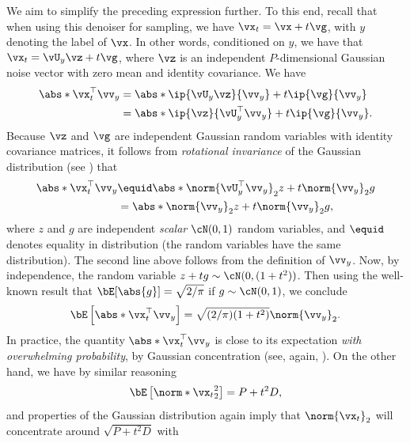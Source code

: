 \documentclass[../../book-main.tex]{subfiles}
\begin{document}
\begin{example}
    We aim to simplify the preceding expression further.
    To this end, recall that when using this denoiser for sampling, we have
    $\vx_t = \vx + t \vg$, with $y$ denoting the label of $\vx$.
    In other words, conditioned on $y$, we have that $\vx_t = \vU_y \vz
    + t \vg$, where $\vz$ is an independent $P$-dimensional Gaussian
    noise vector with zero mean and identity covariance.
    We have
    \begin{align*}
        \abs*{\vx_t^\top \vv_y}
        &=
        \abs*{\ip{\vU_y \vz}{\vv_y} + t \ip{\vg}{\vv_y}}
        \\
        &=
        \abs*{\ip{\vz}{\vU_y^\top \vv_y} + t \ip{\vg}{\vv_y}}.
    \end{align*}
    Because $\vz$ and $\vg$ are independent Gaussian random variables with
    identity covariance matrices, it follows from \textit{rotational invariance}
    of the Gaussian distribution (see \cite{Vershynin2018-br}) that
    \begin{align*}
        \abs*{\vx_t^\top \vv_y}
        &\equid
        \abs*{\norm{\vU_y^\top \vv_y}_2 z + t\norm{\vv_y}_2 g}
        \\
        &=
        \abs*{\norm{\vv_y}_2 z + t\norm{\vv_y}_2 g},
    \end{align*}
    where $z$ and $g$ are independent \textit{scalar} $\cN(0, 1)$ random
    variables, and $\equid$ denotes equality in distribution (the random
    variables have the same distribution).
    The second line above follows from the definition of $\vv_y$.
    Now, by independence, the random variable $z + tg \sim \cN(0, (1 + t^2))$.
    Then using the well-known result that $\bE[\abs{g}] = \sqrt{2/\pi}$ if $g
    \sim \cN(0, 1)$, we conclude
    \begin{equation*}
        \bE\left[
            \abs*{\vx_t^\top \vv_y}
        \right]
        =
        \sqrt{(2/\pi) (1 + t^2)} \norm{\vv_y}_2.
    \end{equation*}
    In practice, the quantity $ \abs*{\vx_t^\top \vv_y}$ is close to its
    expectation \textit{with overwhelming probability}, by Gaussian
    concentration (see, again, \cite{Vershynin2018-br}).
    On the other hand, we have by similar reasoning
    \begin{equation*}
        \bE\left[
            \norm*{\vx_t}_2^2
        \right]
        =
        P + t^2 D,
    \end{equation*}
    and properties of the Gaussian distribution again imply that
    $\norm{\vx_t}_2$ will concentrate around $\sqrt{P + t^2 D}$ with

\end{example}
\end{document}
